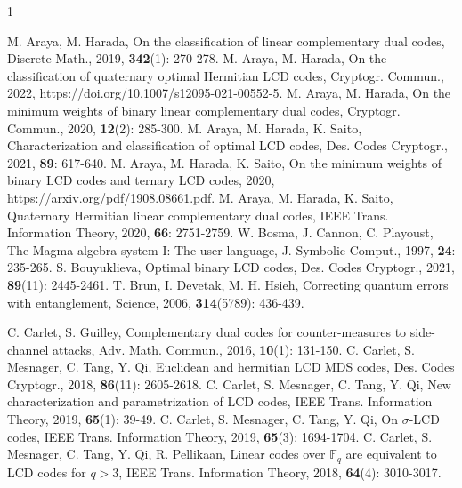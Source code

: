 \documentclass[12pt,twoside]{article}
\newcommand{\F}{\mathbb{F}}
\theoremstyle{plain}
\theoremstyle{definition}
\theoremstyle{remark}
\begin{document}
\begin{thebibliography}{1}

 M. Araya, M. Harada, On the classification of linear complementary dual codes, Discrete Math., 2019, \textbf {342}(1): 270-278.
 M. Araya, M. Harada, On the classification of quaternary optimal Hermitian LCD codes, Cryptogr. Commun., 2022, https://doi.org/10.1007/s12095-021-00552-5.
 M. Araya, M. Harada, On the minimum weights of binary linear complementary dual codes, Cryptogr. Commun., 2020, {\bf12}(2): 285-300.
 M. Araya, M. Harada, K. Saito, Characterization and classification of optimal LCD codes, Des. Codes Cryptogr., 2021, \textbf{89}: 617-640.
     M. Araya, M. Harada, K. Saito, On the minimum weights of binary LCD codes and ternary LCD codes, 2020, https://arxiv.org/pdf/1908.08661.pdf.
 M. Araya, M. Harada, K. Saito, Quaternary Hermitian linear complementary dual codes, IEEE Trans. Information Theory, 2020, {\bf66}: 2751-2759.
         W. Bosma, J. Cannon, C. Playoust, The Magma algebra system I: The user language, J. Symbolic Comput., 1997, {\bf24}: 235-265.
     S. Bouyuklieva, Optimal binary LCD codes, Des. Codes Cryptogr., 2021, \textbf{89}(11): 2445-2461.
 T. Brun, I. Devetak, M. H. Hsieh, Correcting quantum errors with
entanglement, Science, 2006, {\bf314}(5789): 436-439.

 C. Carlet, S. Guilley, Complementary dual codes for counter-measures
to side-channel attacks, Adv. Math. Commun., 2016, \textbf{10}(1): 131-150.
 C. Carlet, S. Mesnager, C. Tang, Y. Qi, Euclidean and hermitian LCD MDS codes, Des. Codes Cryptogr., 2018, \textbf{86}(11): 2605-2618.
     C. Carlet, S. Mesnager, C. Tang, Y. Qi, New characterization and parametrization of LCD codes, IEEE Trans. Information Theory, 2019, {\bf65}(1): 39-49.
 C. Carlet, S. Mesnager, C. Tang, Y. Qi, On $\sigma$-LCD codes, IEEE Trans. Information Theory, 2019, \textbf{65}(3): 1694-1704.
 C. Carlet, S. Mesnager, C. Tang, Y. Qi, R. Pellikaan, Linear codes over $\F_q$ are equivalent to LCD codes for $q > 3$, IEEE Trans. Information Theory, 2018, \textbf {64}(4): 3010-3017.



\end{thebibliography}
\end{document}
